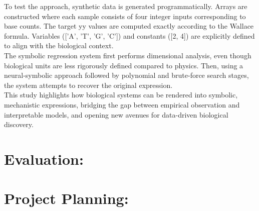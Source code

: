 \documentclass{article}
\begin{document}
To test the approach, synthetic data is generated programmatically. Arrays are constructed where each sample consists of four integer inputs corresponding to base counts. The target yy values are computed exactly according to the Wallace formula. Variables (['A', 'T', 'G', 'C']) and constants ([2, 4]) are explicitly defined to align with the biological context.\\

The symbolic regression system first performs dimensional analysis, even though biological units are less rigorously defined compared to physics. Then, using a neural-symbolic approach followed by polynomial and brute-force search stages, the system attempts to recover the original expression.\\

This study highlights how biological systems can be rendered into symbolic, mechanistic expressions, bridging the gap between empirical observation and interpretable models, and opening new avenues for data-driven biological discovery.\\


\section{Evaluation:}


 



\section{Project Planning: }
\end{document}
